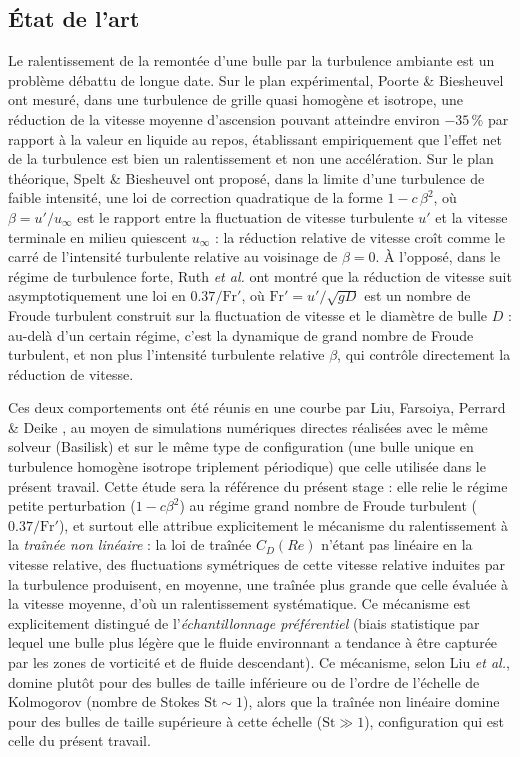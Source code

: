 \subsection{État de l'art}

Le ralentissement de la remontée d'une bulle par la turbulence ambiante est un
problème débattu de longue date. Sur le plan expérimental, Poorte \& Biesheuvel
\cite{poorte2002} ont mesuré, dans une turbulence de grille quasi homogène et
isotrope, une réduction de la vitesse moyenne d'ascension pouvant atteindre
environ $-35\,\%$ par rapport à la valeur en liquide au repos, établissant
empiriquement que l'effet net de la turbulence est bien un ralentissement et non
une accélération. Sur le plan théorique, Spelt \& Biesheuvel \cite{spelt1997} ont
proposé, dans la limite d'une turbulence de faible intensité, une loi de
correction quadratique de la forme $1 - c\,\beta^2$, où $\beta = u'/u_\infty$ est
le rapport entre la fluctuation de vitesse turbulente $u'$ et la vitesse
terminale en milieu quiescent $u_\infty$ : la réduction relative de vitesse croît
comme le carré de l'intensité turbulente relative au voisinage de $\beta = 0$.
À l'opposé, dans le régime de turbulence forte, Ruth \emph{et al.}
\cite{ruth2021} ont montré que la réduction de vitesse suit asymptotiquement une
loi en $0.37/\mathrm{Fr}'$, où $\mathrm{Fr}' = u'/\sqrt{gD}$ est un nombre de
Froude turbulent construit sur la fluctuation de vitesse et le diamètre de bulle
$D$ : au-delà d'un certain régime, c'est la dynamique de grand nombre de Froude
turbulent, et non plus l'intensité turbulente relative $\beta$, qui contrôle
directement la réduction de vitesse.

Ces deux comportements ont été réunis en une courbe  par Liu, Farsoiya, Perrard \& Deike \cite{liu2024}, au moyen de simulations
numériques directes réalisées avec le même solveur (Basilisk) et sur le même type
de configuration (une bulle unique en turbulence homogène isotrope triplement
périodique) que celle utilisée dans le présent travail. Cette étude sera la
référence  du présent stage : elle relie le régime petite
perturbation ($1-c\beta^2$) au régime grand nombre de Froude turbulent
($0.37/\mathrm{Fr}'$), et surtout elle attribue explicitement le mécanisme du
ralentissement à la \emph{traînée non linéaire} : la loi de traînée $C_D(Re)$
n'étant pas linéaire en la vitesse relative, des fluctuations symétriques de
cette vitesse relative induites par la turbulence produisent, en moyenne, une
traînée plus grande que celle évaluée à la vitesse moyenne, d'où un
ralentissement systématique. Ce mécanisme est explicitement distingué de
l'\emph{échantillonnage préférentiel} (biais statistique par lequel une
bulle plus légère que le fluide environnant a tendance à être capturée par les
zones de vorticité et de fluide descendant). Ce mécanisme, selon Liu \emph{et
al.}, domine plutôt pour des bulles de taille inférieure ou de l'ordre de
l'échelle de Kolmogorov (nombre de Stokes $\mathrm{St} \sim 1$), alors que la
traînée non linéaire domine pour des bulles de taille supérieure à cette échelle
($\mathrm{St} \gg 1$), configuration qui est celle du présent travail.

